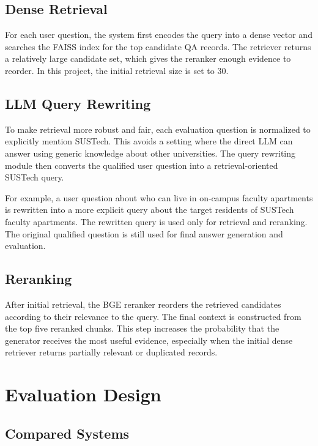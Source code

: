 \subsection{Dense Retrieval}

For each user question, the system first encodes the query into a dense vector and searches the FAISS index for the top candidate QA records. The retriever returns a relatively large candidate set, which gives the reranker enough evidence to reorder. In this project, the initial retrieval size is set to 30.

\subsection{LLM Query Rewriting}

To make retrieval more robust and fair, each evaluation question is normalized to explicitly mention SUSTech. This avoids a setting where the direct LLM can answer using generic knowledge about other universities. The query rewriting module then converts the qualified user question into a retrieval-oriented SUSTech query.

For example, a user question about who can live in on-campus faculty apartments is rewritten into a more explicit query about the target residents of SUSTech faculty apartments. The rewritten query is used only for retrieval and reranking. The original qualified question is still used for final answer generation and evaluation.

\subsection{Reranking}

After initial retrieval, the BGE reranker reorders the retrieved candidates according to their relevance to the query. The final context is constructed from the top five reranked chunks. This step increases the probability that the generator receives the most useful evidence, especially when the initial dense retriever returns partially relevant or duplicated records.

\section{Evaluation Design}

\subsection{Compared Systems}

